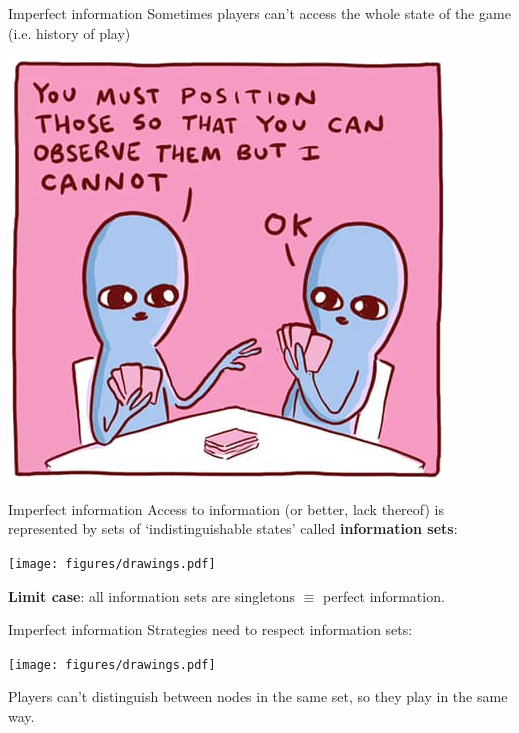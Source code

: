 \begin{frame}{Imperfect information}
	Sometimes players can't access the whole state of the game (i.e. history of play)

	\vfill
	\begin{center}
		\includegraphics[width=.65\textwidth]{figures/imperfect-information.png}
	\end{center}
\end{frame}

\begin{frame}{Imperfect information}
	Access to information (or better, lack thereof) is represented by sets of `indistinguishable states' called \textcolor{coloragents}{\textbf{information sets}}:

	\begin{center}
		{\texttt{[image: figures/drawings.pdf]}}
	\end{center}


	\vfill
	\textbf{Limit case}: all information sets are singletons $\equiv$ perfect information.
\end{frame}

\begin{frame}{Imperfect information}
	\textcolor{coloragents}{Strategies} need to respect information sets:

	\begin{center}
		\texttt{[image: figures/drawings.pdf]}
	\end{center}

	\textcolor{coloragents}{Players} can't distinguish between nodes in the same set, so they play in the same way.

\end{frame}


